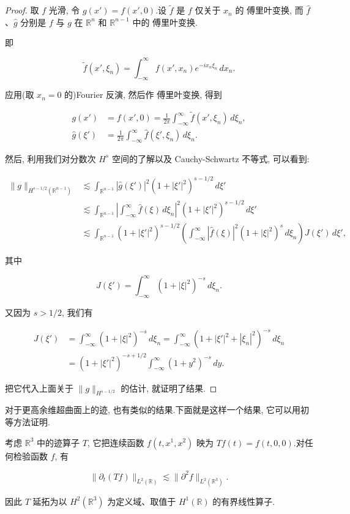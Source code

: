 \begin{proof}
取 $f$ 光滑, 令 $g(x') = f(x', 0)$.设 $\tilde{f}$ 是 $f$ 仅关于 $x_n$ 的 傅里叶变换, 而 $\hat{f}$、$\hat{g}$ 分别是 $f$ 与 $g$ 在 $\mathbb{R}^n$ 和 $\mathbb{R}^{n-1}$ 中的 傅里叶变换.

即

\[
\tilde{f}(x', \xi_n) = \int_{-\infty}^{\infty}f(x', x_n)e^{-ix_n\xi_n}\, dx_n.
\]

应用(取 $x_n = 0$ 的)Fourier 反演, 然后作 傅里叶变换, 得到

\[
\begin{aligned}
g(x') &= f(x', 0) = \frac{1}{2\pi}\int_{-\infty}^{\infty}\tilde{f}(x', \xi_n)\, d\xi_n, \\
\hat{g}(\xi') &= \frac{1}{2\pi}\int_{-\infty}^{\infty}\hat{f}(\xi', \xi_n)\, d\xi_n.
\end{aligned}
\]

然后, 利用我们对分数次 $H^s$ 空间的了解以及 Cauchy-Schwartz 不等式, 可以看到:

\[
\begin{aligned}
\|g\|_{H^{s-1/2}(\mathbb{R}^{n-1})} &\lesssim \int_{\mathbb{R}^{n-1}}|\hat{g}(\xi')|^2(1+|\xi'|^2)^{s-1/2}\, d\xi' \\
&\lesssim \int_{\mathbb{R}^{n-1}}\left|\int_{-\infty}^{\infty}\hat{f}(\xi)\, d\xi_n\right|^2(1+|\xi'|^2)^{s-1/2}\, d\xi' \\
&\lesssim \int_{\mathbb{R}^{n-1}}(1+|\xi'|^2)^{s-1/2}\left(\int_{-\infty}^{\infty}|\hat{f}(\xi)|^2(1+|\xi|^2)^s\, d\xi_n\right)J(\xi')\, d\xi',
\end{aligned}
\]

其中

\[
J(\xi') = \int_{-\infty}^{\infty}(1+|\xi|^2)^{-s}\, d\xi_n.
\]

又因为 $s>1/2$, 我们有

\[
\begin{aligned}
J(\xi') &= \int_{-\infty}^{\infty}(1+|\xi|^2)^{-s}\, d\xi_n = \int_{-\infty}^{\infty}(1+|\xi'|^2+|\xi_n|^2)^{-s}\, d\xi_n \\
&= (1+|\xi'|^2)^{-s+1/2}\int_{-\infty}^{\infty}(1+y^2)^{-s}\, dy.
\end{aligned}
\]

把它代入上面关于 $\|g\|_{H^{s-1/2}}$ 的估计, 就证明了结果.
\end{proof}

对于更高余维超曲面上的迹, 也有类似的结果.下面就是这样一个结果, 它可以用初等方法证明.

\begin{proposition}\label{prop:c6-2.25}
考虑 $\mathbb{R}^3$ 中的迹算子 $T$, 它把连续函数 $f(t, x^1, x^2)$ 映为 $Tf(t) = f(t, 0, 0)$.对任何检验函数 $f$, 有

\begin{equation}
\|\partial_t(Tf)\|_{L^2(\mathbb{R})} \lesssim \|\partial^2 f\|_{L^2(\mathbb{R}^3)}.\label{eq:c6-213}
\end{equation}

因此 $T$ 延拓为以 $H^2(\mathbb{R}^3)$ 为定义域、取值于 $H^1(\mathbb{R})$ 的有界线性算子.
\end{proposition}

